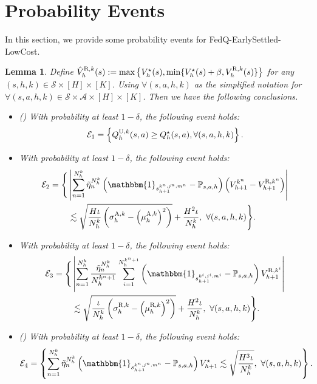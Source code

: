 \documentclass{article}
\newtheorem{lemma}{Lemma}[section]
\newcommand{\U}{\textnormal{U}}
\newcommand{\R}{\textnormal{R}}
\newcommand{\A}{\textnormal{A}}
\newcommand{\sah}{\mathcal{S} \times \mathcal{A} \times [H]}
\begin{document}
\section{Probability Events}
\label{concen}
In this section, we provide some probability events for FedQ-EarlySettled-LowCost.
\begin{lemma}
    \label{concentration}
    Define $\hat{V}_h^{\R,k}(s) :=\max\big\{V_h^\star(s), \min \{V_h^\star(s)+\beta, V_h^{\R,k}(s)\}\big\}$ for any $(s,h,k) \in \mathcal{S} \times [H] \times [K]$. Using $\forall (s,a,h,k)$ as the simplified notation for $\forall (s,a,h,k)\in \sah\times [K]$. Then we have the following conclusions.
    \begin{itemize}
        \item[(a)] \textnormal{(\cite[Lemma C.1]{zheng2023federated})} With probability at least $1-\delta$, the following event holds:
        $$\mathcal{E}_1 = \left\{Q_h^{\U,k}(s,a) \geq Q_h^{\star}(s,a), \forall (s,a,h,k)\right\}.$$
        \item[(b)] With probability at least $1-\delta$, the following event holds:
        \begin{align*}
            \mathcal{E}_2 = \Bigg\{&\left|\sum_{n=1}^{N_h^k} \Tilde{\eta}_n^{N_h^k}\left(\mathbbm{1}_{s_{h+1}^{k^n,j^n,m^n}}-\mathbb{P}_{s,a,h}\right) \left(V_{h+1}^{k^n} - V_{h+1}^{\R,k^n} \right)\right| \\
            &\lesssim \sqrt{\frac{H\iota}{N_h^k}\left(\sigma_h^{\A,k}-\left(\mu_h^{\A,k}\right)^2\right)} + \frac{H^2\iota}{N_h^k},\  \forall (s,a,h,k)\Bigg\}.
        \end{align*}
        \item[(c)] With probability at least $1-\delta$, the following event holds:
        \begin{align*}
            \mathcal{E}_3 = \Bigg\{&\left|\sum_{n=1}^{N_h^k} \frac{\Tilde{\eta}_n^{N_h^k}} {N_h^{k^n+1}}\sum_{i=1}^{N_h^{k^n+1}}\left(\mathbbm{1}_{s_{h+1}^{k^i,j^i,m^i}}-\mathbb{P}_{s,a,h}\right)V_{h+1}^{\R,k^i}\right| \\&\lesssim \sqrt{\frac{\iota}{N_h^k}\left(\sigma_h^{\R,k}-\left(\mu_h^{\R,k}\right)^2\right)} + \frac{H^2\iota}{N_h^k},\  \forall (s,a,h,k)\Bigg\}.
        \end{align*}
        \item[(d)] \textnormal{(\cite[Lemma C.3]{zheng2023federated})} With probability at least $1-\delta$, the following event holds:
        $$\mathcal{E}_4 = \left\{\sum_{n=1}^{N_h^k} \Tilde{\eta}_n^{N_h^k} \left( \mathbbm{1}_{s_{h+1}^{k^n,j^n,m^n}}-\mathbb{P}_{s,a,h}\right) V_{h+1}^{\star} \lesssim \sqrt{\frac{H^3\iota}{N_h^k}},\  \forall (s,a,h,k)\right\}.$$

\end{itemize}
\end{lemma}
\end{document}
